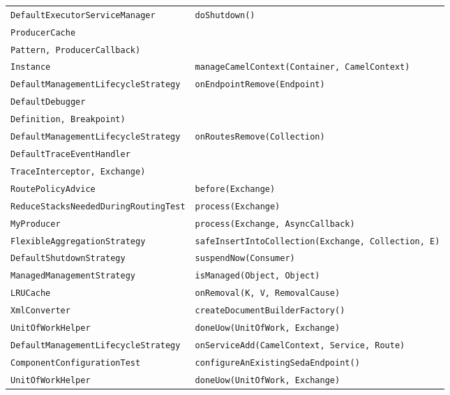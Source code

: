 \begin{center}
\begin{longtable}{ll}
\lstinline/DefaultExecutorServiceManager/&{\lstinline/doShutdown()/}\\
\lstinline/ProducerCache/&\raisebox{-13pt}{\shortstack{\lstinline/doInProducer(Endpoint, Exchange, Exchange/-\\\lstinline/Pattern, ProducerCallback)/}}\\
\lstinline/Instance/&{\lstinline/manageCamelContext(Container, CamelContext)/}\\
\lstinline/DefaultManagementLifecycleStrategy/&{\lstinline/onEndpointRemove(Endpoint)/}\\
\lstinline/DefaultDebugger/&\raisebox{-13pt}{\shortstack{\lstinline/onBeforeProcess(Exchange, Processor, Processor/-\\\lstinline/Definition, Breakpoint)/}}\\
\lstinline/DefaultManagementLifecycleStrategy/&{\lstinline/onRoutesRemove(Collection)/}\\
\lstinline/DefaultTraceEventHandler/&\raisebox{-13pt}{\shortstack{\lstinline/traceExchange(ProcessorDefinition, Processor,/\\\lstinline/TraceInterceptor, Exchange)/}}\\
\lstinline/RoutePolicyAdvice/&{\lstinline/before(Exchange)/}\\
\lstinline/ReduceStacksNeededDuringRoutingTest/&{\lstinline/process(Exchange)/}\\
\lstinline/MyProducer/&{\lstinline/process(Exchange, AsyncCallback)/}\\
\lstinline/FlexibleAggregationStrategy/&{\lstinline/safeInsertIntoCollection(Exchange, Collection, E)/}\\
\lstinline/DefaultShutdownStrategy/&{\lstinline/suspendNow(Consumer)/}\\
\lstinline/ManagedManagementStrategy/&{\lstinline/isManaged(Object, Object)/}\\
\lstinline/LRUCache/&{\lstinline/onRemoval(K, V, RemovalCause)/}\\
\lstinline/XmlConverter/&{\lstinline/createDocumentBuilderFactory()/}\\
\lstinline/UnitOfWorkHelper/&{\lstinline/doneUow(UnitOfWork, Exchange)/}\\
\lstinline/DefaultManagementLifecycleStrategy/&{\lstinline/onServiceAdd(CamelContext, Service, Route)/}\\
\lstinline/ComponentConfigurationTest/&{\lstinline/configureAnExistingSedaEndpoint()/}\\
\lstinline/UnitOfWorkHelper/&{\lstinline/doneUow(UnitOfWork, Exchange)/}\\

\end{longtable}
\end{center}
